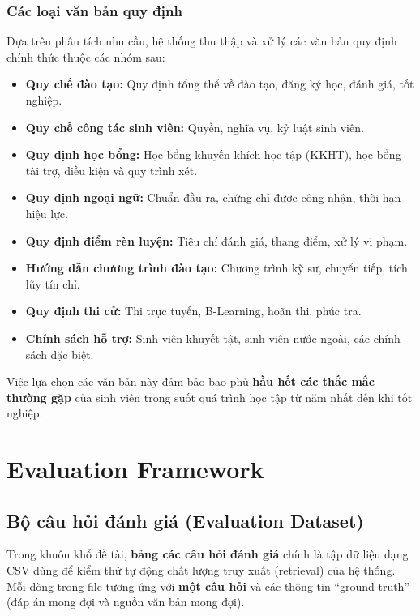 \documentclass[../DoAn.tex]{subfiles}
\begin{document}
\subsubsection{Các loại văn bản quy định}

Dựa trên phân tích nhu cầu, hệ thống thu thập và xử lý các văn bản quy định chính thức thuộc các nhóm sau:

\begin{itemize}
    \item \textbf{Quy chế đào tạo:} Quy định tổng thể về đào tạo, đăng ký học, đánh giá, tốt nghiệp.
    \item \textbf{Quy chế công tác sinh viên:} Quyền, nghĩa vụ, kỷ luật sinh viên.
    \item \textbf{Quy định học bổng:} Học bổng khuyến khích học tập (KKHT), học bổng tài trợ, điều kiện và quy trình xét.
    \item \textbf{Quy định ngoại ngữ:} Chuẩn đầu ra, chứng chỉ được công nhận, thời hạn hiệu lực.
    \item \textbf{Quy định điểm rèn luyện:} Tiêu chí đánh giá, thang điểm, xử lý vi phạm.
    \item \textbf{Hướng dẫn chương trình đào tạo:} Chương trình kỹ sư, chuyển tiếp, tích lũy tín chỉ.
    \item \textbf{Quy định thi cử:} Thi trực tuyến, B-Learning, hoãn thi, phúc tra.
    \item \textbf{Chính sách hỗ trợ:} Sinh viên khuyết tật, sinh viên nước ngoài, các chính sách đặc biệt.
\end{itemize}

Việc lựa chọn các văn bản này đảm bảo bao phủ \textbf{hầu hết các thắc mắc thường gặp} của sinh viên trong suốt quá trình học tập từ năm nhất đến khi tốt nghiệp.

\section{Evaluation Framework}

\subsection{Bộ câu hỏi đánh giá (Evaluation Dataset)}

Trong khuôn khổ đề tài, \textbf{bảng các câu hỏi đánh giá} chính là tập dữ liệu dạng CSV dùng để kiểm thử tự động chất lượng truy xuất (retrieval) của hệ thống. Mỗi dòng trong file tương ứng với \textbf{một câu hỏi} và các thông tin ``ground truth'' (đáp án mong đợi và nguồn văn bản mong đợi).
\end{document}
